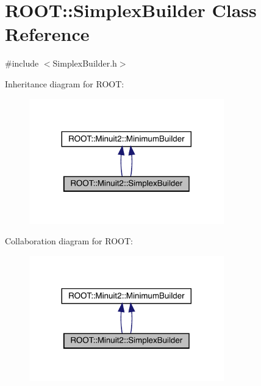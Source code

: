 \hypertarget{classROOT_1_1Minuit2_1_1SimplexBuilder}{}\section{R\+O\+OT\+:\+:Simplex\+Builder Class Reference}
\label{classROOT_1_1Minuit2_1_1SimplexBuilder}


{\ttfamily \#include $<$Simplex\+Builder.\+h$>$}



Inheritance diagram for R\+O\+OT\+:\nopagebreak
\begin{figure}[H]
\begin{center}
\leavevmode
\includegraphics[width=239pt]{d5/d1f/classROOT_1_1Minuit2_1_1SimplexBuilder__inherit__graph}
\end{center}
\end{figure}


Collaboration diagram for R\+O\+OT\+:\nopagebreak
\begin{figure}[H]
\begin{center}
\leavevmode
\includegraphics[width=239pt]{d1/df0/classROOT_1_1Minuit2_1_1SimplexBuilder__coll__graph}
\end{center}
\end{figure}
